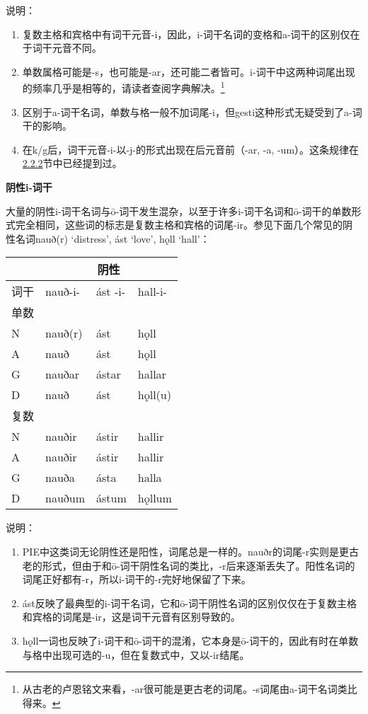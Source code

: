 说明：

\begin{enumerate}
\def\labelenumi{\arabic{enumi})}
\item
  复数主格和宾格中有词干元音-i，因此，i-词干名词的变格和a-词干的区别仅在于词干元音不同。
\item
  单数属格可能是-s，也可能是-ar，还可能二者皆可。i-词干中这两种词尾出现的频率几乎是相等的，请读者查阅字典解决。\footnote{从古老的卢恩铭文来看，-ar很可能是更古老的词尾。-s词尾由a-词干名词类比得来。}
\item
  区别于a-词干名词，单数与格一般不加词尾-i，但gesti这种形式无疑受到了a-词干的影响。
\item
  在k/g后，词干元音-i-以-j-的形式出现在后元音前（-ar, -a,
  -um）。这条规律在\hyperref[ajawa-ux8bcdux5e72]{2.2.2}节中已经提到过。
\end{enumerate}

\textbf{阴性i-词干}

大量的阴性i-词干名词与ō-词干发生混杂，以至于许多i-词干名词和ō-词干的单数形式完全相同，这些词的标志是复数主格和宾格的词尾-ir。参见下面几个常见的阴性名词nauð(r)
`distress', ást `love', hǫll `hall'：

\begin{longtable}{llll}
\toprule
 &\multicolumn{3}{c}{阴性} \\
\midrule
\endhead
\bottomrule
\endfoot
词干 & nauð-i- & ást -i- & hall-i- \\
单数 & & & \\
N & nauð(r) & ást & hǫll \\
A & nauð & ást & hǫll \\
G & nauðar & ástar & hallar \\
D & nauð & ást & hǫll(u) \\
复数 & & & \\
N & nauðir & ástir & hallir \\
A & nauðir & ástir & hallir \\
G & nauða & ásta & halla \\
D & nauðum & ástum & hǫllum \\
\end{longtable}

说明：

\begin{enumerate}
\def\labelenumi{\arabic{enumi})}
\item
  PIE中这类词无论阴性还是阳性，词尾总是一样的。nauðr的词尾-r实则是更古老的形式，但由于和ō-词干阴性名词的类比，-r后来逐渐丢失了。阳性名词的词尾正好都有-r，所以i-词干的-r完好地保留了下来。
\item
  ást反映了最典型的i-词干名词，它和ō-词干阴性名词的区别仅仅在于复数主格和宾格的词尾是-ir，这是词干元音有区别导致的。
\item
  hǫll一词也反映了i-词干和ō-词干的混淆，它本身是ō-词干的，因此有时在单数与格中出现可选的-u，但在复数式中，又以-ir结尾。
\end{enumerate}

